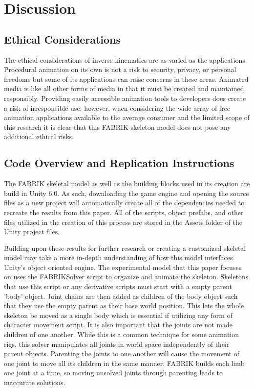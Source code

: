 \documentclass[10pt,twocolumn]{article}
\begin{document}
\section{Discussion}

\subsection{Ethical Considerations}

The ethical considerations of inverse kinematics are as varied as the applications. Procedural animation on its own is not a risk to security, privacy, or personal freedoms but some of its applications can raise concerns in these areas. Animated media is like all other forms of media in that it must be created and maintained responsibly. Providing easily accessible animation tools to developers does create a risk of irresponsible use; however, when considering the wide array of free animation applications available to the average consumer and the limited scope of this research it is clear that this FABRIK skeleton model does not pose any additional ethical risks.

\subsection{Code Overview and Replication Instructions}

The FABRIK skeletal model as well as the building blocks used in its creation are build in Unity 6.0. As such, downloading the game engine and opening the source files as a new project will automatically create all of the dependencies needed to recreate the results from this paper. All of the scripts, object prefabs, and other files utilized in the creation of this process are stored in the Assets folder of the Unity project files. 

Building upon these results for further research or creating a customized skeletal model may take a more in-depth understanding of how this model interfaces Unity's object oriented engine. The experimental model that this paper focuses on uses the FABRIKSolver script to organize and animate the skeleton. Skeletons that use this script or any derivative scripts must start with a empty parent 'body' object. Joint chains are then added as children of the body object such that they use the empty parent as their base world position. This lets the whole skeleton be moved as a single body which is essential if utilizing any form of character movement script. It is also important that the joints are not made children of one another. While this is a common technique for some animation rigs, this solver manipulates all joints in world space independently of their parent objects. Parenting the joints to one another will cause the movement of one joint to move all its children in the same manner. FABRIK builds each limb one joint at a time, so moving unsolved joints through parenting leads to inaccurate solutions. 
\end{document}

